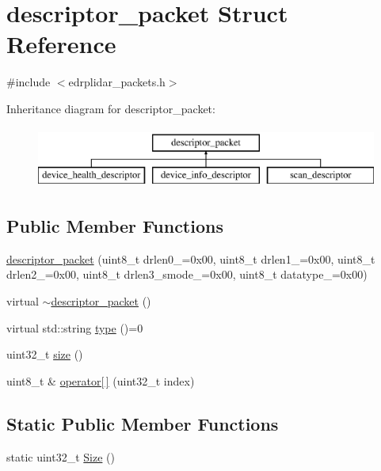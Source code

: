 \hypertarget{structdescriptor__packet}{\section{descriptor\-\_\-packet Struct Reference}
\label{structdescriptor__packet}
}


{\ttfamily \#include $<$edrplidar\-\_\-packets.\-h$>$}

Inheritance diagram for descriptor\-\_\-packet\-:\begin{figure}[H]
\begin{center}
\leavevmode
\includegraphics[height=2.000000cm]{structdescriptor__packet}
\end{center}
\end{figure}
\subsection*{Public Member Functions}
\begin{DoxyCompactItemize}
\item 
\hyperlink{structdescriptor__packet_acb50c5d7e23d6b85a2310672d9f17e95}{descriptor\-\_\-packet} (uint8\-\_\-t drlen0\-\_\-=0x00, uint8\-\_\-t drlen1\-\_\-=0x00, uint8\-\_\-t drlen2\-\_\-=0x00, uint8\-\_\-t drlen3\-\_\-smode\-\_\-=0x00, uint8\-\_\-t datatype\-\_\-=0x00)
\item 
virtual \hyperlink{structdescriptor__packet_acd7f79e7aefbdf4f6b0638ab75df6d46}{$\sim$descriptor\-\_\-packet} ()
\item 
virtual std\-::string \hyperlink{structdescriptor__packet_ad08369aae987f91544cee5e8f2267f2f}{type} ()=0
\item 
uint32\-\_\-t \hyperlink{structdescriptor__packet_a3b14c4024796ba8b45f582b0bd7d1f50}{size} ()
\item 
uint8\-\_\-t \& \hyperlink{structdescriptor__packet_a92b50972015f1bb1b4a99d0f0910c3e3}{operator\mbox{[}$\,$\mbox{]}} (uint32\-\_\-t index)
\end{DoxyCompactItemize}
\subsection*{Static Public Member Functions}
\begin{DoxyCompactItemize}
\item 
static uint32\-\_\-t \hyperlink{structdescriptor__packet_ab197e4207edc6c708dca8d0b0bbfc098}{Size} ()
\end{DoxyCompactItemize}

